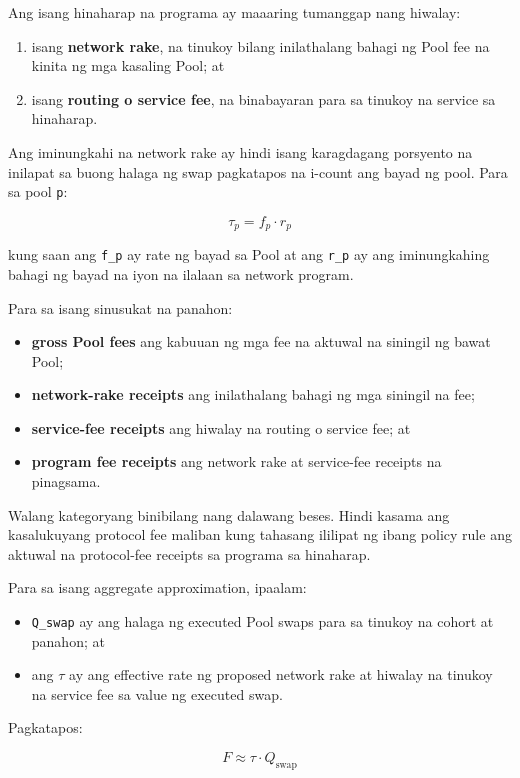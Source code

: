 \documentclass[11pt]{article}
\begin{document}
Ang isang hinaharap na programa ay maaaring tumanggap nang hiwalay:

\begin{enumerate}[leftmargin=*]
\item isang \textbf{network rake}, na tinukoy bilang inilathalang bahagi ng Pool fee na kinita ng mga kasaling Pool; at
\item isang \textbf{routing o service fee}, na binabayaran para sa tinukoy na service sa hinaharap.
\end{enumerate}
Ang iminungkahi na network rake ay hindi isang karagdagang porsyento na inilapat sa buong halaga ng swap pagkatapos na i-count ang bayad ng pool. Para sa pool \texttt{p}:

\[
\tau_p = f_p \cdot r_p
\]

kung saan ang \texttt{f\_p} ay rate ng bayad sa Pool at ang \texttt{r\_p} ay ang iminungkahing bahagi ng bayad na iyon na ilalaan sa network program.

Para sa isang sinusukat na panahon:

\begin{itemize}[leftmargin=*]
\item \textbf{gross Pool fees} ang kabuuan ng mga fee na aktuwal na siningil ng bawat Pool;
\item \textbf{network-rake receipts} ang inilathalang bahagi ng mga siningil na fee;
\item \textbf{service-fee receipts} ang hiwalay na routing o service fee; at
\item \textbf{program fee receipts} ang network rake at service-fee receipts na pinagsama.
\end{itemize}
Walang kategoryang binibilang nang dalawang beses. Hindi kasama ang kasalukuyang protocol fee maliban kung tahasang ililipat ng ibang policy rule ang aktuwal na protocol-fee receipts sa programa sa hinaharap.

Para sa isang aggregate approximation, ipaalam:

\begin{itemize}[leftmargin=*]
\item \texttt{Q\_swap} ay ang halaga ng executed Pool swaps para sa tinukoy na cohort at panahon; at
\item ang \texttt{$\tau$} ay ang effective rate ng proposed network rake at hiwalay na tinukoy na service fee sa value ng executed swap.
\end{itemize}
Pagkatapos:

\[
F \approx \tau \cdot Q_{\mathrm{swap}}
\]
\end{document}
